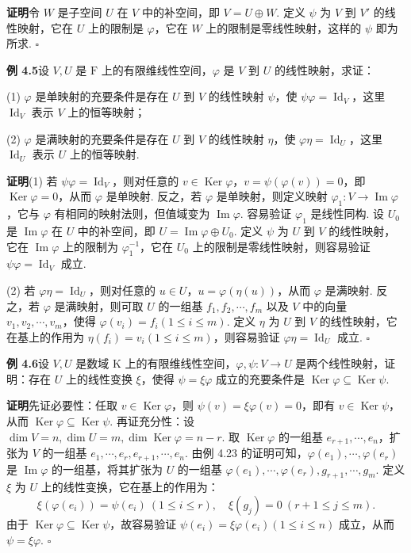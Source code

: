 \documentclass[UTF8, 12pt, fontset=fandol, oneside]{ctexart}
\begin{document}
\noindent\textbf{证明}\quad 令 $W$ 是子空间 $U$ 在 $V$ 中的补空间，即 $V=U\oplus W$. 定义 $\psi$ 为 $V$ 到 $V'$ 的线性映射，它在 $U$ 上的限制是 $\varphi$，它在 $W$ 上的限制是零线性映射，这样的 $\psi$ 即为所求. $\square$

\noindent\textbf{例 4.5}\quad 设 $V,U$ 是 $\mathrm{F}$ 上的有限维线性空间，$\varphi$ 是 $V$ 到 $U$ 的线性映射，求证：

(1) $\varphi$ 是单映射的充要条件是存在 $U$ 到 $V$ 的线性映射 $\psi$，使 $\psi\varphi=\operatorname{Id}_V$，这里 $\operatorname{Id}_V$ 表示 $V$ 上的恒等映射；

(2) $\varphi$ 是满映射的充要条件是存在 $U$ 到 $V$ 的线性映射 $\eta$，使 $\varphi\eta=\operatorname{Id}_U$，这里 $\operatorname{Id}_U$ 表示 $U$ 上的恒等映射.

\noindent\textbf{证明}\quad (1) 若 $\psi\varphi=\operatorname{Id}_V$，则对任意的 $v\in\operatorname{Ker}\varphi$，$v=\psi(\varphi(v))=0$，即 $\operatorname{Ker}\varphi=0$，从而 $\varphi$ 是单映射. 反之，若 $\varphi$ 是单映射，则定义映射 $\varphi_1:V\to\operatorname{Im}\varphi$，它与 $\varphi$ 有相同的映射法则，但值域变为 $\operatorname{Im}\varphi$. 容易验证 $\varphi_1$ 是线性同构. 设 $U_0$ 是 $\operatorname{Im}\varphi$ 在 $U$ 中的补空间，即 $U=\operatorname{Im}\varphi\oplus U_0$. 定义 $\psi$ 为 $U$ 到 $V$ 的线性映射，它在 $\operatorname{Im}\varphi$ 上的限制为 $\varphi_1^{-1}$，它在 $U_0$ 上的限制是零线性映射，则容易验证 $\psi\varphi=\operatorname{Id}_V$ 成立.

(2) 若 $\varphi\eta=\operatorname{Id}_U$，则对任意的 $u\in U$，$u=\varphi(\eta(u))$，从而 $\varphi$ 是满映射. 反之，若 $\varphi$ 是满映射，则可取 $U$ 的一组基 $f_1,f_2,\cdots,f_m$ 以及 $V$ 中的向量 $v_1,v_2,\cdots,v_m$，使得 $\varphi(v_i)=f_i(1\le i\le m)$. 定义 $\eta$ 为 $U$ 到 $V$ 的线性映射，它在基上的作用为 $\eta(f_i)=v_i(1\le i\le m)$，则容易验证 $\varphi\eta=\operatorname{Id}_U$ 成立. $\square$

\noindent\textbf{例 4.6}\quad 设 $V,U$ 是数域 $\mathrm{K}$ 上的有限维线性空间，$\varphi,\psi:V\to U$ 是两个线性映射，证明：存在 $U$ 上的线性变换 $\xi$，使得 $\psi=\xi\varphi$ 成立的充要条件是 $\operatorname{Ker}\varphi\subseteq\operatorname{Ker}\psi$.

\noindent\textbf{证明}\quad 先证必要性：任取 $v\in\operatorname{Ker}\varphi$，则 $\psi(v)=\xi\varphi(v)=0$，即有 $v\in\operatorname{Ker}\psi$，从而 $\operatorname{Ker}\varphi\subseteq\operatorname{Ker}\psi$. 再证充分性：设 $\dim V=n,\dim U=m,\dim\operatorname{Ker}\varphi=n-r$. 取 $\operatorname{Ker}\varphi$ 的一组基 $e_{r+1},\cdots,e_n$，扩张为 $V$ 的一组基 $e_1,\cdots,e_r,e_{r+1},\cdots,e_n$. 由例 4.23 的证明可知，$\varphi(e_1),\cdots,\varphi(e_r)$ 是 $\operatorname{Im}\varphi$ 的一组基，将其扩张为 $U$ 的一组基 $\varphi(e_1),\cdots,\varphi(e_r),g_{r+1},\cdots,g_m$. 定义 $\xi$ 为 $U$ 上的线性变换，它在基上的作用为：
\[
\xi(\varphi(e_i))=\psi(e_i)\ (1\le i\le r),\quad \xi(g_j)=0\ (r+1\le j\le m).
\]
由于 $\operatorname{Ker}\varphi\subseteq\operatorname{Ker}\psi$，故容易验证 $\psi(e_i)=\xi\varphi(e_i)(1\le i\le n)$ 成立，从而 $\psi=\xi\varphi$. $\square$
\end{document}
